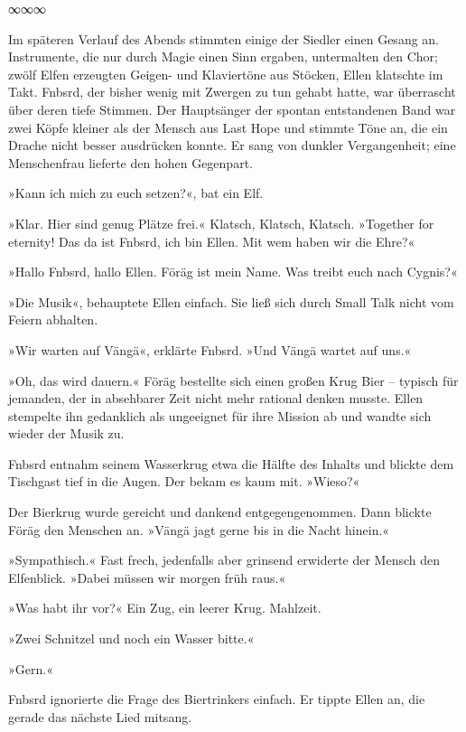 \begin{center}
∞∞∞
\end{center}

Im späteren Verlauf des Abends stimmten einige der Siedler einen Gesang an. Instrumente, die nur durch Magie einen Sinn ergaben, untermalten den Chor; zwölf Elfen erzeugten Geigen- und Klaviertöne aus Stöcken, Ellen klatschte im Takt. Fnbsrd, der bisher wenig mit Zwergen zu tun gehabt hatte, war überrascht über deren tiefe Stimmen. Der Hauptsänger der spontan entstandenen Band war zwei Köpfe kleiner als der Mensch aus Last Hope und stimmte Töne an, die ein Drache nicht besser ausdrücken konnte. Er sang von dunkler Vergangenheit; eine Menschenfrau lieferte den hohen Gegenpart.

»Kann ich mich zu euch setzen?«, bat ein Elf.

»Klar. Hier sind genug Plätze frei.« Klatsch, Klatsch, Klatsch. »Together for eternity! Das da ist Fnbsrd, ich bin Ellen. Mit wem haben wir die Ehre?«

»Hallo Fnbsrd, hallo Ellen. Föräg ist mein Name. Was treibt euch nach Cygnis?«

»Die Musik«, behauptete Ellen einfach. Sie ließ sich durch Small Talk nicht vom Feiern abhalten.

»Wir warten auf Vängä«, erklärte Fnbsrd. »Und Vängä wartet auf uns.«

»Oh, das wird dauern.« Föräg bestellte sich einen großen Krug Bier – typisch für jemanden, der in absehbarer Zeit nicht mehr rational denken musste. Ellen stempelte ihn gedanklich als ungeeignet für ihre Mission ab und wandte sich wieder der Musik zu.

Fnbsrd entnahm seinem Wasserkrug etwa die Hälfte des Inhalts und blickte dem Tischgast tief in die Augen. Der bekam es kaum mit.  »Wieso?«

Der Bierkrug wurde gereicht und dankend entgegengenommen. Dann blickte Föräg den Menschen an. »Vängä jagt gerne bis in die Nacht hinein.«

»Sympathisch.« Fast frech, jedenfalls aber grinsend erwiderte der Mensch den Elfenblick. »Dabei müssen wir morgen früh raus.«

»Was habt ihr vor?« Ein Zug, ein leerer Krug. Mahlzeit.

»Zwei Schnitzel und noch ein Wasser bitte.«

»Gern.«

Fnbsrd ignorierte die Frage des Biertrinkers einfach. Er tippte Ellen an, die gerade das nächste Lied mitsang.

